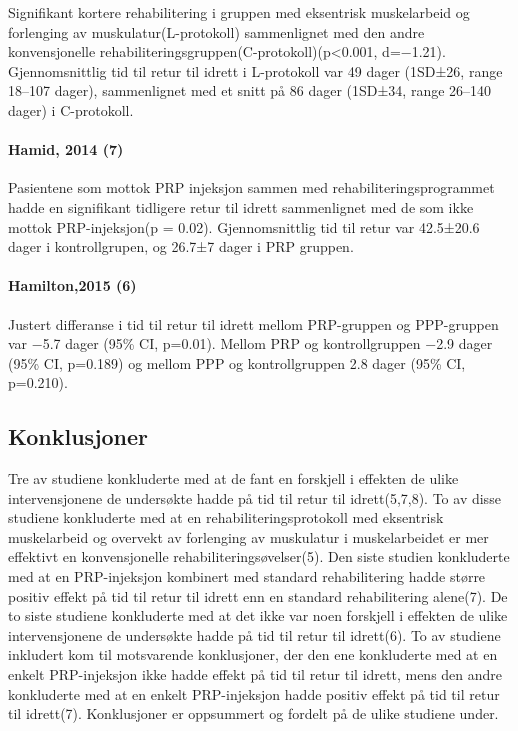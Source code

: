 \documentclass[
]{article}
\begin{document}
Signifikant kortere rehabilitering i gruppen med eksentrisk muskelarbeid
og forlenging av muskulatur(L-protokoll) sammenlignet med den andre
konvensjonelle rehabiliteringsgruppen(C-protokoll)(p\textless0.001,
d=−1.21). Gjennomsnittlig tid til retur til idrett i L-protokoll var 49
dager (1SD±26, range 18--107 dager), sammenlignet med et snitt på 86
dager (1SD±34, range 26--140 dager) i C-protokoll.

\hypertarget{hamid-2014-ahamid2014}{%
\paragraph{Hamid, 2014 (7)}\label{hamid-2014-ahamid2014}}

Pasientene som mottok PRP injeksjon sammen med rehabiliteringsprogrammet
hadde en signifikant tidligere retur til idrett sammenlignet med de som
ikke mottok PRP-injeksjon(p = 0.02). Gjennomsnittlig tid til retur var
42.5±20.6 dager i kontrollgrupen, og 26.7±7 dager i PRP gruppen.

\hypertarget{hamilton2015-hamilton2015}{%
\paragraph{Hamilton,2015 (6)}\label{hamilton2015-hamilton2015}}

Justert differanse i tid til retur til idrett mellom PRP-gruppen og
PPP-gruppen var −5.7 dager (95\% CI, p=0.01). Mellom PRP og
kontrollgruppen −2.9 dager (95\% CI, p=0.189) og mellom PPP og
kontrollgruppen 2.8 dager (95\% CI, p=0.210).

\hypertarget{konklusjoner}{%
\subsection{Konklusjoner}\label{konklusjoner}}

Tre av studiene konkluderte med at de fant en forskjell i effekten de
ulike intervensjonene de undersøkte hadde på tid til retur til
idrett(5,7,8). To av disse studiene konkluderte med at en
rehabiliteringsprotokoll med eksentrisk muskelarbeid og overvekt av
forlenging av muskulatur i muskelarbeidet er mer effektivt en
konvensjonelle rehabiliteringsøvelser(5). Den siste studien konkluderte
med at en PRP-injeksjon kombinert med standard rehabilitering hadde
større positiv effekt på tid til retur til idrett enn en standard
rehabilitering alene(7). De to siste studiene konkluderte med at det
ikke var noen forskjell i effekten de ulike intervensjonene de
undersøkte hadde på tid til retur til idrett(6). To av studiene
inkludert kom til motsvarende konklusjoner, der den ene konkluderte med
at en enkelt PRP-injeksjon ikke hadde effekt på tid til retur til
idrett, mens den andre konkluderte med at en enkelt PRP-injeksjon hadde
positiv effekt på tid til retur til idrett(7). Konklusjoner er
oppsummert og fordelt på de ulike studiene under.
\end{document}
